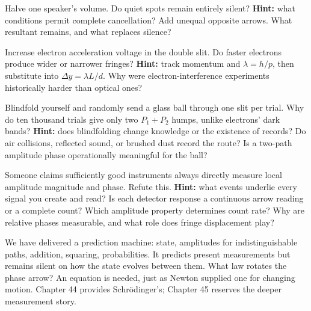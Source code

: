 \begin{puzzles}
\item Halve one speaker's volume. Do quiet spots remain entirely silent? \textbf{Hint:} what conditions permit complete cancellation? Add unequal opposite arrows. What resultant remains, and what replaces silence?
\item Increase electron acceleration voltage in the double slit. Do faster electrons produce wider or narrower fringes? \textbf{Hint:} track momentum and \(\lambda = h/p\), then substitute into \(\Delta y = \lambda L/d\). Why were electron-interference experiments historically harder than optical ones?
\item Blindfold yourself and randomly send a glass ball through one slit per trial. Why do ten thousand trials give only two \(P_1 + P_2\) humps, unlike electrons' dark bands? \textbf{Hint:} does blindfolding change knowledge or the existence of records? Do air collisions, reflected sound, or brushed dust record the route? Is a two-path amplitude phase operationally meaningful for the ball?
\item Someone claims sufficiently good instruments always directly measure local amplitude magnitude and phase. Refute this. \textbf{Hint:} what events underlie every signal you create and read? Is each detector response a continuous arrow reading or a complete count? Which amplitude property determines count rate? Why are relative phases measurable, and what role does fringe displacement play?
\end{puzzles}

We have delivered a prediction machine: state, amplitudes for indistinguishable paths, addition, squaring, probabilities. It predicts present measurements but remains silent on how the state evolves between them. What law rotates the phase arrow? An equation is needed, just as Newton supplied one for changing motion. Chapter 44 provides Schrödinger's; Chapter 45 reserves the deeper measurement story.
